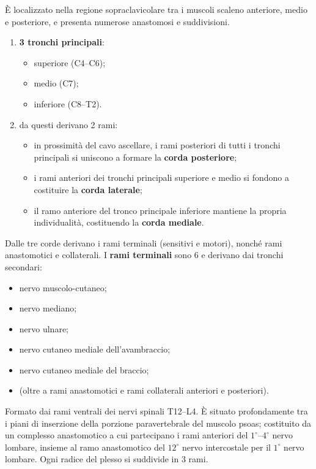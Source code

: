 È localizzato nella regione sopraclavicolare tra i muscoli scaleno
anteriore, medio e posteriore, e presenta numerose anastomosi e
suddivisioni.
\begin{enumerate}
  \item \textbf{3 tronchi principali}:
  \begin{itemize}
    \item superiore (C4--C6);
    \item medio (C7);
    \item inferiore (C8--T2).
  \end{itemize}
  \item da questi derivano 2 rami:
  \begin{itemize}
    \item in prossimità del cavo ascellare, i rami posteriori di tutti i
      tronchi principali si uniscono a formare la \textbf{corda posteriore};
    \item i rami anteriori dei tronchi principali superiore e medio si
      fondono a costituire la \textbf{corda laterale};
    \item il ramo anteriore del tronco principale inferiore mantiene la
      propria individualità, costituendo la \textbf{corda mediale}.
  \end{itemize}
\end{enumerate}

Dalle tre corde derivano i rami terminali (sensitivi e motori), nonché rami
anastomotici e collaterali. I \textbf{rami terminali} sono $6$ e derivano
dai tronchi secondari:
\begin{itemize}
  \item nervo muscolo-cutaneo;
  \item nervo mediano;
  \item nervo ulnare;
  \item nervo cutaneo mediale dell'avambraccio;
  \item nervo cutaneo mediale del braccio;
  \item (oltre a rami anastomotici e rami collaterali anteriori e
    posteriori).
\end{itemize}

Formato dai rami ventrali dei nervi spinali T12--L4. È situato profondamente
tra i piani di inserzione della porzione paravertebrale del muscolo psoas;
costituito da un complesso anastomotico a cui partecipano i rami anteriori
del $1^\circ$--$4^\circ$ nervo lombare, insieme al ramo anastomotico del
$12^\circ$ nervo intercostale per il $1^\circ$ nervo lombare. Ogni radice del
plesso si suddivide in 3 rami.

